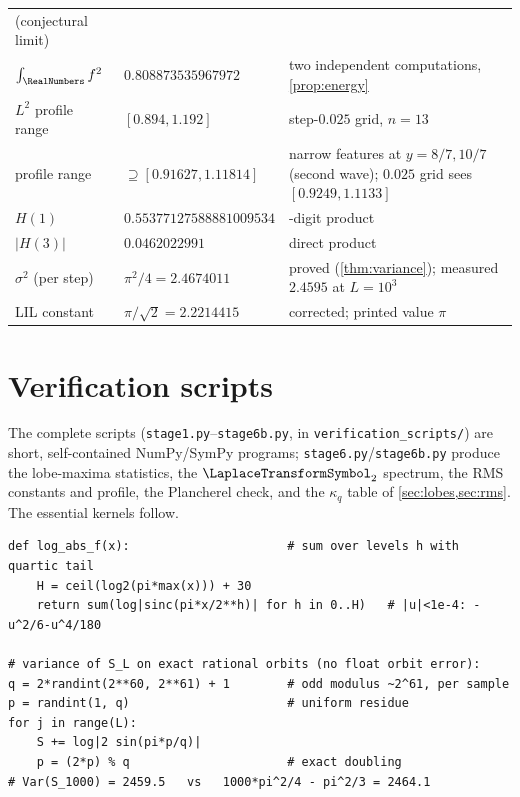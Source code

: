 \documentclass[11pt,oneside]{article}
\theoremstyle{definition}
\theoremstyle{remark}
\begin{document}
\begin{center}
\begin{tabularx}{\textwidth}{@{}l
 >{\raggedright\arraybackslash}p{}
 >{\raggedright\arraybackslash}X@{}}
(conjectural limit)\\
$\int_\RealNumbers f^2$ & $0.808873535967972$ & two independent computations,
\cref{prop:energy}\\
$L^2$ profile range & $[0.894,1.192]$ & step-$0.025$ grid, $n=13$\\
profile range & $\supseteq[0.91627,1.11814]$ & narrow features at
$y=8/7,10/7$ (second wave); $0.025$ grid sees $[0.9249,1.1133]$\\
$H(1)$ & $0.55377127588881009534$ & 30-digit product\\
$|H(3)|$ & $0.0462022991$ & direct product\\
$\sigma^2$ (per step) & $\pi^2/4=2.4674011$ & proved
(\cref{thm:variance}); measured $2.4595$ at $L=10^3$\\
LIL constant & $\pi/\sqrt2=2.2214415$ & corrected; printed value $\pi$\\
\bottomrule
\end{tabularx}
\end{center}

\section{Verification scripts}
\label{app:scripts}

The complete scripts (\texttt{stage1.py}--\texttt{stage6b.py}, in
\nolinkurl{verification_scripts/}) are short, self-contained NumPy/SymPy
programs; \texttt{stage6.py}/\texttt{stage6b.py} produce the lobe-maxima
statistics, the $\LaplaceTransformSymbol_2$ spectrum, the RMS constants and profile, the
Plancherel check, and the $\kappa_q$ table of
\cref{sec:lobes,sec:rms}.  The essential kernels follow.

\begin{lstlisting}[style=pseudo,caption={Evaluation of $\log|f|$ and the
exact-orbit variance measurement}]
def log_abs_f(x):                      # sum over levels h with quartic tail
    H = ceil(log2(pi*max(x))) + 30
    return sum(log|sinc(pi*x/2**h)| for h in 0..H)   # |u|<1e-4: -u^2/6-u^4/180

# variance of S_L on exact rational orbits (no float orbit error):
q = 2*randint(2**60, 2**61) + 1        # odd modulus ~2^61, per sample
p = randint(1, q)                      # uniform residue
for j in range(L):
    S += log|2 sin(pi*p/q)|
    p = (2*p) % q                      # exact doubling
# Var(S_1000) = 2459.5   vs   1000*pi^2/4 - pi^2/3 = 2464.1
\end{lstlisting}
\end{document}
